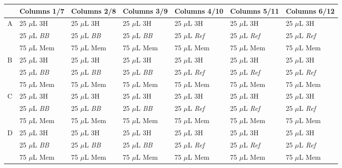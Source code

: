 \documentclass[12pt, letterpaper]{article}
\begin{document}
\begin{table}[h]
    \begin{center}
        \begin{tabular}{|l|lll|lll|}
        \hline
        & Columns 1/7         & Columns 2/8         & Columns 3/9         & Columns 4/10         & Columns 5/11         & Columns 6/12         \\ \hline
        A & 25 $\mu$L 3H        & 25 $\mu$L 3H        & 25 $\mu$L 3H        & 25 $\mu$L 3H         & 25 $\mu$L 3H         & 25 $\mu$L 3H         \\
        & 25 $\mu$L \emph{BB} & 25 $\mu$L \emph{BB} & 25 $\mu$L \emph{BB} & 25 $\mu$L \emph{Ref} & 25 $\mu$L \emph{Ref} & 25 $\mu$L \emph{Ref} \\
        & 75 $\mu$L Mem       & 75 $\mu$L Mem       & 75 $\mu$L Mem       & 75 $\mu$L Mem        & 75 $\mu$L Mem        & 75 $\mu$L Mem        \\ \hline
        B & 25 $\mu$L 3H        & 25 $\mu$L 3H        & 25 $\mu$L 3H        & 25 $\mu$L 3H         & 25 $\mu$L 3H         & 25 $\mu$L 3H         \\
        & 25 $\mu$L \emph{BB} & 25 $\mu$L \emph{BB} & 25 $\mu$L \emph{BB} & 25 $\mu$L \emph{Ref} & 25 $\mu$L \emph{Ref} & 25 $\mu$L \emph{Ref} \\
        & 75 $\mu$L Mem       & 75 $\mu$L Mem       & 75 $\mu$L Mem       & 75 $\mu$L Mem        & 75 $\mu$L Mem        & 75 $\mu$L Mem        \\ \hline
        C & 25 $\mu$L 3H        & 25 $\mu$L 3H        & 25 $\mu$L 3H        & 25 $\mu$L 3H         & 25 $\mu$L 3H         & 25 $\mu$L 3H         \\
        & 25 $\mu$L \emph{BB} & 25 $\mu$L \emph{BB} & 25 $\mu$L \emph{BB} & 25 $\mu$L \emph{Ref} & 25 $\mu$L \emph{Ref} & 25 $\mu$L \emph{Ref} \\
        & 75 $\mu$L Mem       & 75 $\mu$L Mem       & 75 $\mu$L Mem       & 75 $\mu$L Mem        & 75 $\mu$L Mem        & 75 $\mu$L Mem        \\ \hline
        D & 25 $\mu$L 3H        & 25 $\mu$L 3H        & 25 $\mu$L 3H        & 25 $\mu$L 3H         & 25 $\mu$L 3H         & 25 $\mu$L 3H         \\
        & 25 $\mu$L \emph{BB} & 25 $\mu$L \emph{BB} & 25 $\mu$L \emph{BB} & 25 $\mu$L \emph{Ref} & 25 $\mu$L \emph{Ref} & 25 $\mu$L \emph{Ref} \\
        & 75 $\mu$L Mem       & 75 $\mu$L Mem       & 75 $\mu$L Mem       & 75 $\mu$L Mem        & 75 $\mu$L Mem        & 75 $\mu$L Mem        \\ \hline

\end{tabular}
\end{center}
\end{table}
\end{document}
